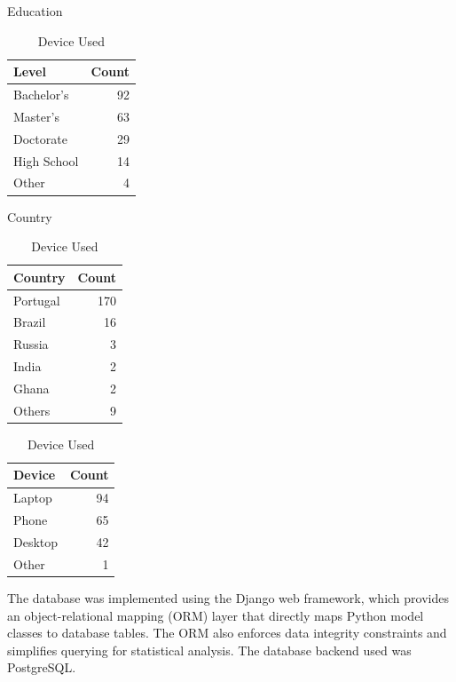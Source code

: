 \begin{table}
    \begin{subtable}{0.3\textwidth}
        \centering
        \caption{Education}
        \begin{tabular}{lr}
            \hline
            Level & Count \\
            \hline
            Bachelor's & 92 \\
            Master's & 63 \\
            Doctorate & 29 \\
            High School & 14 \\
            Other & 4 \\
            \hline
        \end{tabular}
    \end{subtable}
    \hfill
    \begin{subtable}{0.3\textwidth}
        \centering
        \caption{Country}
        \begin{tabular}{lr}
            \hline
            Country & Count \\
            \hline
            Portugal & 170 \\
            Brazil & 16 \\
            Russia & 3  \\
            India & 2 \\
            Ghana & 2 \\
            Others & 9 \\
            \hline
        \end{tabular}
    \end{subtable}
    \hfill
    \begin{subtable}{0.3\textwidth}
        \centering
        \caption{Device Used}
        \begin{tabular}{lr}
            \hline
            Device & Count \\
            \hline
            Laptop & 94 \\
            Phone & 65 \\
            Desktop & 42 \\
            Other & 1 \\
            \hline
        \end{tabular}
    \end{subtable}
\end{table}



The database was implemented using the Django web framework, which provides an object-relational mapping (ORM) layer that directly maps Python model classes to database tables. The ORM also enforces data integrity constraints and simplifies querying for statistical analysis. The database backend used was PostgreSQL.

